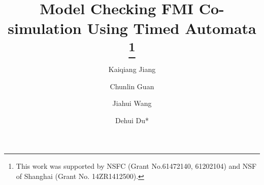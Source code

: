 \documentclass[runningheads,a4paper]{llncs}
\begin{document}
\title{Model Checking FMI Co-simulation Using Timed Automata
\thanks{This work was supported by NSFC (Grant No.61472140, 61202104) and NSF of Shanghai (Grant No. 14ZR1412500).}}


%
%
\author{Kaiqiang Jiang
\and Chunlin Guan\and Jiahui Wang\and Dehui Du*}
%


%
%

\maketitle
\end{document}
